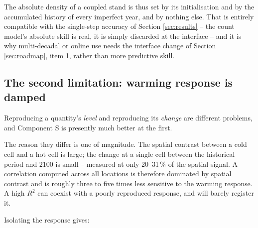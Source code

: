 \documentclass[11pt]{article}
\begin{document}
The absolute density of a coupled stand is thus set by its initialisation and by the accumulated history of every imperfect year, and by nothing else. That is entirely compatible with the single-step accuracy of Section \ref{sec:results} -- the count model's absolute skill is real, it is simply discarded at the interface -- and it is why multi-decadal or online use needs the interface change of Section \ref{sec:roadmap}, item 1, rather than more predictive skill.

\subsection{The second limitation: warming response is damped}
\label{sec:damping}

Reproducing a quantity's \emph{level} and reproducing its \emph{change} are different problems, and Component S is presently much better at the first.

The reason they differ is one of magnitude. The spatial contrast between a cold cell and a hot cell is large; the change at a single cell between the historical period and 2100 is small -- measured at only 20--31\,\% of the spatial signal. A correlation computed across all locations is therefore dominated by spatial contrast and is roughly three to five times less sensitive to the warming response. A high $R^2$ can coexist with a poorly reproduced response, and will barely register it.

Isolating the response gives:
\end{document}
